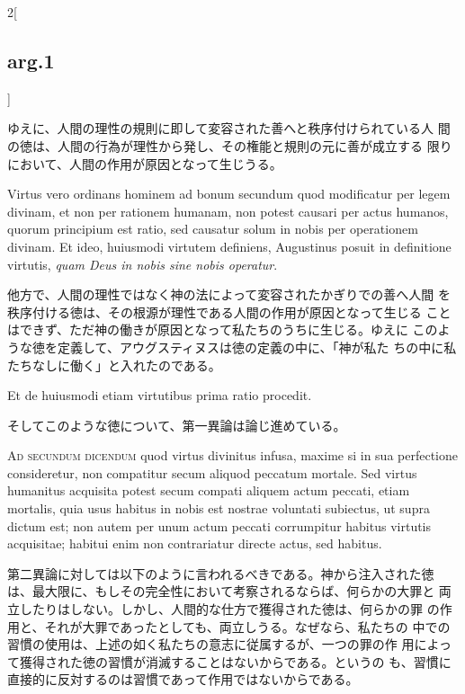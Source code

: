 \documentclass[paper=a4paper,fontsize=10pt,jafontsize=9pt,titlepage]{jlreq}
\begin{document}
\begin{paracol}{2}[\subsection{arg.1}]
\switchcolumn

ゆえに、人間の理性の規則に即して変容された善へと秩序付けられている人
 間の徳は、人間の行為が理性から発し、その権能と規則の元に善が成立する
 限りにおいて、人間の作用が原因となって生じうる。

\switchcolumn*

Virtus vero ordinans hominem ad bonum secundum quod modificatur per
legem divinam, et non per rationem humanam, non potest causari per
actus humanos, quorum principium est ratio, sed causatur solum in
nobis per operationem divinam. Et ideo, huiusmodi virtutem definiens,
Augustinus posuit in definitione virtutis, {\itshape quam Deus in
nobis sine nobis operatur}.

\switchcolumn

他方で、人間の理性ではなく神の法によって変容されたかぎりでの善へ人間
 を秩序付ける徳は、その根源が理性である人間の作用が原因となって生じる
 ことはできず、ただ神の働きが原因となって私たちのうちに生じる。ゆえに
 このような徳を定義して、アウグスティヌスは徳の定義の中に、「神が私た
 ちの中に私たちなしに働く」と入れたのである。

\switchcolumn*

Et de huiusmodi etiam virtutibus prima ratio procedit.

\switchcolumn

そしてこのような徳について、第一異論は論じ進めている。

\switchcolumn*[\subsection{ad.2}]

{\scshape Ad secundum dicendum} quod virtus divinitus infusa, maxime
 si in sua perfectione consideretur, non compatitur secum aliquod
 peccatum mortale. Sed virtus humanitus acquisita potest secum compati
 aliquem actum peccati, etiam mortalis, quia usus habitus in nobis est
 nostrae voluntati subiectus, ut supra dictum est; non autem per unum
 actum peccati corrumpitur habitus virtutis acquisitae; habitui enim
 non contrariatur directe actus, sed habitus.

\switchcolumn

第二異論に対しては以下のように言われるべきである。神から注入された徳
 は、最大限に、もしその完全性において考察されるならば、何らかの大罪と
 両立したりはしない。しかし、人間的な仕方で獲得された徳は、何らかの罪
 の作用と、それが大罪であったとしても、両立しうる。なぜなら、私たちの
 中での習慣の使用は、上述の如く私たちの意志に従属するが、一つの罪の作
 用によって獲得された徳の習慣が消滅することはないからである。というの
 も、習慣に直接的に反対するのは習慣であって作用ではないからである。


\end{paracol}
\end{document}

